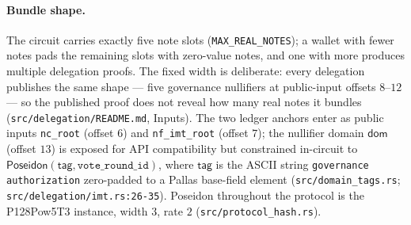 \documentclass[11pt,a4paper]{article}
\theoremstyle{definition}
\begin{document}
\paragraph{Bundle shape.} The circuit carries exactly five note slots
(\texttt{MAX\_REAL\_NOTES}); a wallet with fewer notes pads the remaining
slots with zero-value notes, and one with more produces multiple delegation
proofs. The fixed width is deliberate: every delegation publishes the same
shape --- five governance nullifiers at public-input offsets $8$--$12$ ---
so the published proof does not reveal how many real notes it bundles
(\texttt{src/delegation/README.md}, Inputs). The two ledger anchors enter as
public inputs \texttt{nc\_root} (offset $6$) and \texttt{nf\_imt\_root}
(offset $7$); the nullifier domain $\mathsf{dom}$ (offset $13$) is exposed
for API compatibility but constrained in-circuit to
$\mathsf{Poseidon}(\mathsf{tag}, \texttt{vote\_round\_id})$, where
$\mathsf{tag}$ is the ASCII string \texttt{governance authorization}
zero-padded to a Pallas base-field element
(\texttt{src/domain\_tags.rs}; \texttt{src/delegation/imt.rs:26-35}).
Poseidon throughout the protocol is the P128Pow5T3 instance, width $3$,
rate $2$ (\texttt{src/protocol\_hash.rs}).
\end{document}
